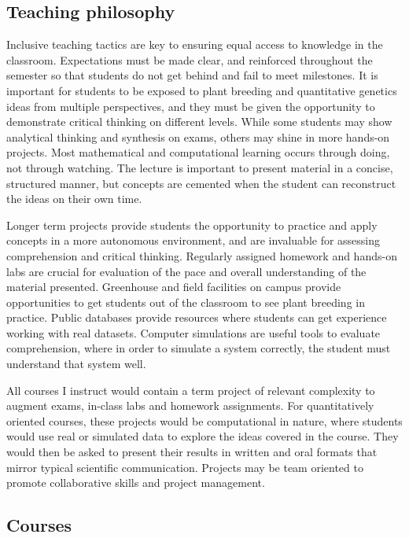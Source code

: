 \documentclass[11pt]{article}
\begin{document}
\subsection*{Teaching philosophy}

Inclusive teaching tactics are key to ensuring equal access to knowledge in the classroom. Expectations must be made clear, and reinforced throughout the semester so that students do not get behind and fail to meet milestones. It is important for students to be exposed to plant breeding and quantitative genetics ideas from multiple perspectives, and they must be given the opportunity to demonstrate critical thinking on different levels. While some students may show analytical thinking and synthesis on exams, others may shine in more hands-on projects. Most mathematical and computational learning occurs through doing, not through watching. The lecture is important to present material in a concise, structured manner, but concepts are cemented when the student can reconstruct the ideas on their own time.


Longer term projects provide students the opportunity to practice and apply concepts in a more autonomous environment, and are invaluable for assessing comprehension and critical thinking. Regularly assigned homework and hands-on labs are crucial for evaluation of the pace and overall understanding of the material presented. Greenhouse and field facilities on campus provide opportunities to get students out of the classroom to see plant breeding in practice. Public databases provide resources where students can get experience working with real datasets. Computer simulations are useful tools to evaluate comprehension, where in order to simulate a system correctly, the student must understand that system well.

All courses I instruct would contain a term project of relevant complexity to augment exams, in-class labs and homework assignments. For quantitatively oriented courses, these projects would be computational in nature, where students would use real or simulated data to explore the ideas covered in the course. They would then be asked to present their results in written and oral formats that mirror typical scientific communication. Projects may be team oriented to promote collaborative skills and project management. %

\subsection*{Courses}
\end{document}

